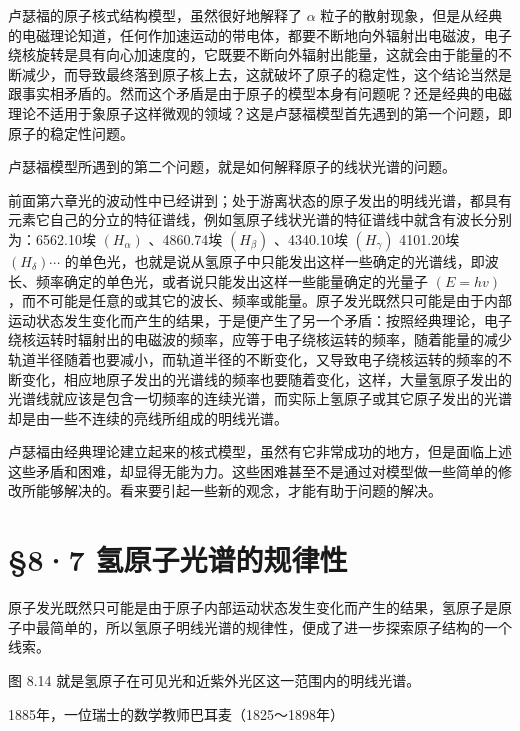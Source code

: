 卢瑟福的原子核式结构模型，虽然很好地解释了 \(\alpha\)
粒子的散射现象，但是从经典的电磁理论知道，任何作加速运动的带电体，都要不断地向外辐射出电磁波，电子绕核旋转是具有向心加速度的，它既要不断向外辐射出能量，这就会由于能量的不断减少，而导致最终落到原子核上去，这就破坏了原子的稳定性，这个结论当然是跟事实相矛盾的。然而这个矛盾是由于原子的模型本身有问题呢？还是经典的电磁理论不适用于象原子这样微观的领域？这是卢瑟福模型首先遇到的第一个问题，即原子的稳定性问题。

卢瑟福模型所遇到的第二个问题，就是如何解释原子的线状光谱的问题。

前面第六章光的波动性中已经讲到；处于游离状态的原子发出的明线光谱，都具有元素它自己的分立的特征谱线，例如氢原子线状光谱的特征谱线中就含有波长分别为：6562.10埃
\((H_{\alpha})\) 、4860.74埃 \((H_{\beta})\) 、4340.10埃
\((H_{\gamma})\) 4101.20埃 \((H_{\delta})\cdots\)
的单色光，也就是说从氢原子中只能发出这样一些确定的光谱线，即波长、频率确定的单色光，或者说只能发出这样一些能量确定的光量子
\((E=hv)\)
，而不可能是任意的或其它的波长、频率或能量。原子发光既然只可能是由于内部运动状态发生变化而产生的结果，于是便产生了另一个矛盾：按照经典理论，电子绕核运转时辐射出的电磁波的频率，应等于电子绕核运转的频率，随着能量的减少轨道半径随着也要减小，而轨道半径的不断变化，又导致电子绕核运转的频率的不断变化，相应地原子发出的光谱线的频率也要随着变化，这样，大量氢原子发出的光谱线就应该是包含一切频率的连续光谱，而实际上氢原子或其它原子发出的光谱却是由一些不连续的亮线所组成的明线光谱。

卢瑟福由经典理论建立起来的核式模型，虽然有它非常成功的地方，但是面临上述这些矛盾和困难，却显得无能为力。这些困难甚至不是通过对模型做一些简单的修改所能够解决的。看来要引起一些新的观念，才能有助于问题的解决。

\section{§8·7
氢原子光谱的规律性}

原子发光既然只可能是由于原子内部运动状态发生变化而产生的结果，氢原子是原子中最简单的，所以氢原子明线光谱的规律性，便成了进一步探索原子结构的一个线索。

图 8.14 就是氢原子在可见光和近紫外光区这一范围内的明线光谱。

1885年，一位瑞士的数学教师巴耳麦（1825～1898年）


